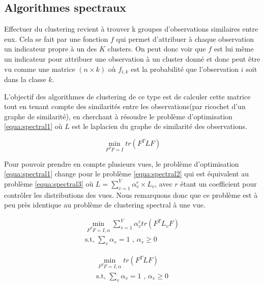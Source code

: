 \documentclass[12pt, french, latin.medieval, a4paper]{report}
\begin{document}
        \subsection{Algorithmes spectraux}
        Effectuer du clustering revient à trouver k groupes d'observations similaires entre eux. Cela se fait par une fonction $f$ qui permet d'attribuer à chaque observation un indicateur propre à un des $K$ clusters. On peut donc voir que $f$ est lui même un indicateur pour attribuer une observation à un cluster donné et donc peut être vu comme une matrice $(n \times k)$ où $f_{i,k}$ est la probabilité que l'observation $i$ soit dans la classe $k$.
        
        L'objectif des algorithmes de clustering de ce type est de calculer cette matrice tout en tenant compte des similarités entre les observations(par ricochet d'un graphe de similarité), en cherchant à résoudre le problème d'optimisation \ref{equa:spectral1} où $L$ est le laplacien du graphe de similarité des observations.
        
        \begin{equation}
            \min_{F^{T}F = I} tr(F^{T}LF)
            \label{equa:spectral1}
        \end{equation}

        Pour pouvoir prendre en compte plusieurs vues, le problème d'optimisation \ref{equa:spectral1} change pour le problème \ref{equa:spectral2} qui est équivalent au problème \ref{equa:spectral3} où $L = \sum_{v=1}^{V} \alpha_{v}^{r} \times L_{v}$, avec $r$ étant un coefficient pour contrôler les distributions des vues. Nous remarquons donc que ce problème est à peu près identique au problème de clustering spectral à une vue.

        \begin{equation}
            \begin{aligned}
                \min_{F^{T}F = I, \alpha} \sum_{v=1}^{V} \alpha_{v}^{r} tr(F^{T}L_{v}F) \\
                \text{s.t, } \sum_{v} \alpha_{v} = 1 \text{ , } \alpha_{v} \geq 0
            \end{aligned}
            \label{equa:spectral2}
        \end{equation}

        \begin{equation}
            \begin{aligned}
                \min_{F^{T}F = I, \alpha} tr(F^{T}LF) \\
                \text{s.t, } \sum_{v} \alpha_{v} = 1 \text{ , } \alpha_{v} \geq 0
            \end{aligned}
            \label{equa:spectral3}
        \end{equation}
\end{document}
